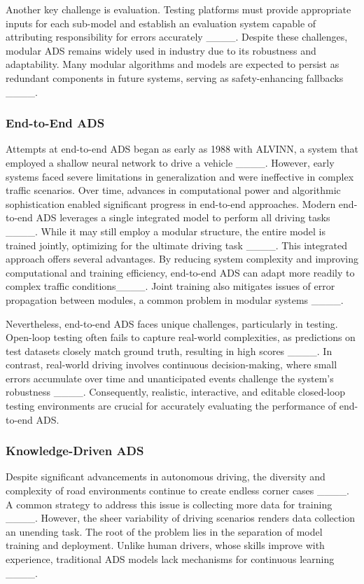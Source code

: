 Another key challenge is evaluation. Testing platforms must provide appropriate inputs for each sub-model and establish an evaluation system capable of attributing responsibility for errors accurately ____. Despite these challenges, modular ADS remains widely used in industry due to its robustness and adaptability. Many modular algorithms and models are expected to persist as redundant components in future systems, serving as safety-enhancing fallbacks ____.

\subsubsection{End-to-End ADS}


Attempts at end-to-end ADS began as early as 1988 with ALVINN, a system that employed a shallow neural network to drive a vehicle ____. However, early systems faced severe limitations in generalization and were ineffective in complex traffic scenarios. Over time, advances in computational power and algorithmic sophistication enabled significant progress in end-to-end approaches. Modern end-to-end ADS leverages a single integrated model to perform all driving tasks ____. While it may still employ a modular structure, the entire model is trained jointly, optimizing for the ultimate driving task ____. This integrated approach offers several advantages. By reducing system complexity and improving computational and training efficiency, end-to-end ADS can adapt more readily to complex traffic conditions____. Joint training also mitigates issues of error propagation between modules, a common problem in modular systems ____.

Nevertheless, end-to-end ADS faces unique challenges, particularly in testing. Open-loop testing often fails to capture real-world complexities, as predictions on test datasets closely match ground truth, resulting in high scores ____. In contrast, real-world driving involves continuous decision-making, where small errors accumulate over time and unanticipated events challenge the system's robustness ____. Consequently, realistic, interactive, and editable closed-loop testing environments are crucial for accurately evaluating the performance of end-to-end ADS.

\subsubsection{Knowledge-Driven ADS}



Despite significant advancements in autonomous driving, the diversity and complexity of road environments continue to create endless corner cases ____. A common strategy to address this issue is collecting more data for training ____. However, the sheer variability of driving scenarios renders data collection an unending task. The root of the problem lies in the separation of model training and deployment. Unlike human drivers, whose skills improve with experience, traditional ADS models lack mechanisms for continuous learning ____.

